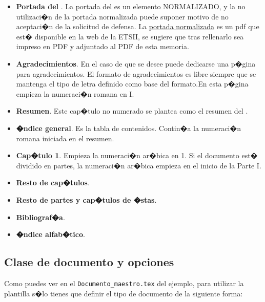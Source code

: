 \begin{itemize}

	\item \textbf{Portada del \TF}. La portada del \TF es un elemento NORMALIZADO, y la no utilizaci�n de la portada normalizada puede suponer motivo de no aceptaci�n de la solicitud de defensa. La \href{\urldescargas}{portada normalizada} es un pdf que est� disponible en la web de la ETSII, se sugiere que tras rellenarlo sea impreso en PDF y adjuntado al PDF de esta memoria.

	\item \textbf{Agradecimientos}. En el caso de que se desee puede dedicarse una p�gina para agradecimientos. El formato de agradecimientos es libre siempre que se mantenga el tipo de letra definido como base del formato.En esta p�gina empieza la numeraci�n romana en I.

	\item \textbf{Resumen}. Este cap�tulo no numerado se plantea como el resumen del \TF. 
	
	\item \textbf{�ndice general}. Es la tabla de contenidos. Contin�a la numeraci�n romana iniciada en el resumen.
	
	\item \textbf{Cap�tulo 1}. Empieza la numeraci�n ar�bica en 1. Si el documento est� dividido en partes, la numeraci�n ar�bica empieza en el inicio de la Parte I.
	
	\item \textbf{Resto de cap�tulos}.
	
	\item \textbf{Resto de partes y cap�tulos de �stas}.
	
	\item \textbf{Bibliograf�a}.
	
	\item \textbf{�ndice alfab�tico}.

\end{itemize}


\subsection{Clase de documento y opciones}
\label{sec:manual:opciones}

Como puedes ver en el \verb'Documento_maestro.tex' del ejemplo, para utilizar la plantilla s�lo tienes que definir el tipo de documento de la siguiente forma:

